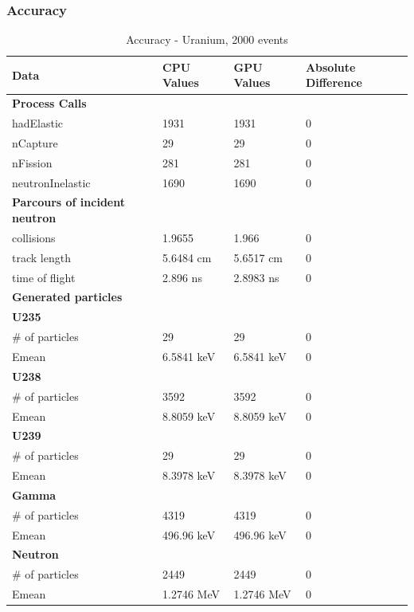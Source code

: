 \documentclass[12pt]{article}
\begin{document}
	\subsubsection{Accuracy}
		\begin{table}[H]
		\centering
		\caption{Accuracy - Uranium, 2000 events}\label{sys2Acc}
		\begin{tabular}{llll}
		\toprule
		\bf Data & \bf  CPU Values &  \bf GPU Values &  \bf Absolute Difference\\\midrule
		\bf Process Calls&&&\\
		hadElastic&1931&1931&0\\
		nCapture&29&29&0\\
		nFission&281&281&0\\		
		neutronInelastic&1690&1690&0\\ 

		\midrule	
		\bf Parcours of incident neutron&&&\\
		collisions&1.9655&1.966&0\\
		track length&5.6484 cm&5.6517 cm&0\\
		time of flight&2.896 ns&2.8983 ns&0\\
		
		\midrule
		\bf Generated particles&&&\\
		\bf{U235}&&&\\
		\# of particles&29&29&0\\
		Emean&6.5841 keV&6.5841 keV&0\\
		
		\bf{U238}&&&\\
		\# of particles&3592&3592&0\\
		Emean&8.8059 keV&8.8059 keV&0\\
		
		\bf{U239}&&&\\
		\# of particles&29&29&0\\
		Emean&8.3978 keV&8.3978 keV&0\\
		
		\bf{Gamma}&&&\\
		\# of particles&4319&4319&0\\
		Emean&496.96 keV&496.96 keV&0\\
		
		\bf{Neutron}&&&\\
		\# of particles&2449&2449&0\\
		Emean&1.2746 MeV&1.2746 MeV&0\\\bottomrule
		
		\end{tabular}
		\end{table}
\end{document}
